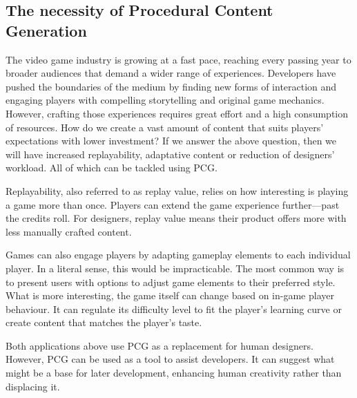 \subsection{The necessity of Procedural Content Generation}
The video game industry is growing at a fast pace, reaching every passing year to broader audiences that demand a wider range of experiences. Developers have pushed the boundaries of the medium by finding new forms of interaction and engaging players with compelling storytelling and original game mechanics. However, crafting those experiences  requires great effort and a high consumption of resources. How do we create a vast amount of content that suits players' expectations with lower investment? If we answer the above question, then we will have increased replayability, adaptative content or reduction of designers' workload. All of which can be tackled using PCG.\cite{togelius2016introduction}


Replayability, also referred to as replay value, relies on how interesting is playing a game more than once. Players can extend the game experience further---past the credits roll. For designers, replay value means their product offers more with less manually crafted content.

Games can also engage players by adapting gameplay elements to each individual player. In a literal sense, this would be impracticable. The most common way is to present users with options to adjust game elements to their preferred style. What is more interesting, the game itself can change based on in-game player behaviour. It can regulate its difficulty level to fit the player's learning curve or create content that matches the player's taste.


Both applications above use PCG as a replacement for human designers. However, PCG can be used as a tool to assist developers. It can suggest what might be a base for later development, enhancing human creativity rather than displacing it. 


